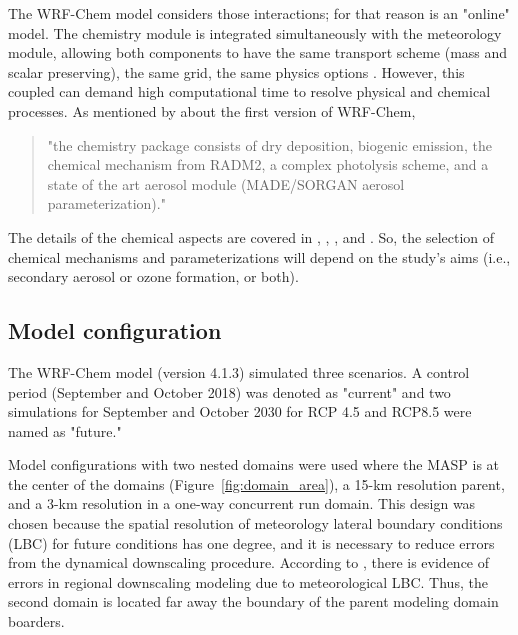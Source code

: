 The WRF-Chem model considers those interactions; for that reason is an "online" model. 
The chemistry module is integrated simultaneously with the meteorology module, allowing both components to have the same transport scheme (mass and scalar preserving), the same grid, the same physics options \citep{Grell2005}.
However, this coupled can demand high computational time to resolve physical and chemical processes.
As mentioned by \cite{Grell2005} about the first version of WRF-Chem,
\begin{quote}
    "the chemistry package consists of dry deposition, biogenic emission, the chemical mechanism from RADM2, a complex photolysis scheme, and a state of the art aerosol module (MADE/SORGAN aerosol parameterization)."
\end{quote}
The details of the chemical aspects are covered in \citet{Zaveri1999}, \cite{Grell2005}, \cite{Fast2006}, and \cite{Gustafson2007}.
So, the selection of chemical mechanisms and parameterizations will depend on the study's aims (i.e., secondary aerosol or ozone formation, or both).

\subsection{Model configuration}
The WRF-Chem model (version 4.1.3) simulated three scenarios.
A control period (September and October 2018) was denoted as "current" and two simulations for September and October 2030 for RCP 4.5 and RCP8.5 were named as "future."

Model configurations with two nested domains were used where the MASP is at the center of the domains (Figure~\ref{fig:domain_area}), a 15-km resolution parent, and a 3-km resolution in a one-way concurrent run domain.
This design was chosen because the spatial resolution of meteorology lateral boundary conditions (LBC) for future conditions has one degree, and it is necessary to reduce  errors from the dynamical downscaling procedure.
According to \citet{Warner2011}, there is evidence of errors in regional downscaling modeling due to meteorological LBC.
Thus, the second domain is located far away the boundary of the parent modeling domain boarders.

